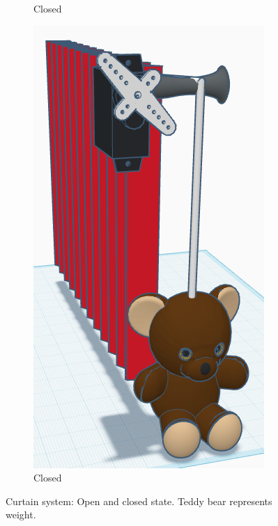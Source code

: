 \documentclass[a4paper,12pt]{article}
\begin{document}
\begin{figure}
\begin{subfigure}[][][]{0.5\textwidth}
        \caption{Closed}
    \end{subfigure}
    \begin{subfigure}[][][b]{0.4\textwidth}
        \includegraphics[width=\linewidth]{figures/curtainModelClosedFront.png}
        \caption{Closed}
    \end{subfigure}
 
    \caption{Curtain system: Open and closed state. Teddy bear represents weight.}
    \label{fig:CurtainMechanismOpen}
\end{figure}
\end{document}
